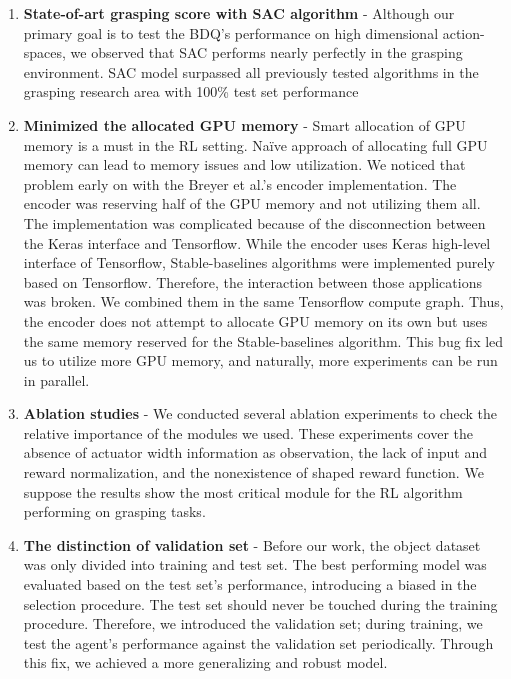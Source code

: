 \begin{enumerate}
    \item \textbf{State-of-art grasping score with SAC algorithm} - Although our primary goal is to test the BDQ's performance on high dimensional action-spaces, we observed that SAC performs nearly perfectly in the grasping environment. SAC model surpassed all previously tested algorithms in the grasping research area with 100\% test set performance
    
    \item \textbf{Minimized the allocated GPU memory
    } - Smart allocation of GPU memory is a must in the RL setting. Naïve approach of allocating full GPU memory can lead to memory issues and low utilization. We noticed that problem early on with the Breyer et al.'s encoder implementation. The encoder was reserving half of the GPU memory and not utilizing them all. The implementation was complicated because of the disconnection between the Keras interface and Tensorflow. While the encoder uses Keras high-level interface of Tensorflow, Stable-baselines algorithms were implemented purely based on Tensorflow. Therefore, the interaction between those applications was broken. We combined them in the same Tensorflow compute graph. Thus, the encoder does not attempt to allocate GPU memory on its own but uses the same memory reserved for the Stable-baselines algorithm. This bug fix led us to utilize more GPU memory, and naturally, more experiments can be run in parallel.
    
    \item \textbf{Ablation studies
    } - We conducted several ablation experiments to check the relative importance of the modules we used. These experiments cover the absence of actuator width information as observation, the lack of input and reward normalization, and the nonexistence of shaped reward function.  We suppose the results show the most critical module for the RL algorithm performing on grasping tasks.
    
    \item \textbf{The distinction of validation set
    } -  Before our work, the object dataset was only divided into training and test set. The best performing model was evaluated based on the test set's performance, introducing a biased in the selection procedure.  The test set should never be touched during the training procedure. Therefore, we introduced the validation set; during training, we test the agent's performance against the validation set periodically. Through this fix, we achieved a more generalizing and robust model.
\end{enumerate}



   

 













